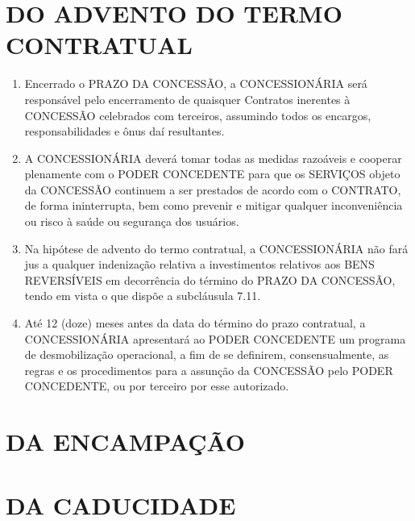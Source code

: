 \documentclass[a4paper,11pt]{report} %
\begin{document}
\section{DO ADVENTO DO TERMO CONTRATUAL}
\label{sec:DEZU}
\begin{enumerate}
\item \label{itm:UFFU} Encerrado o PRAZO DA CONCESSÃO, a CONCESSIONÁRIA será responsável pelo encerramento de quaisquer Contratos inerentes à CONCESSÃO celebrados com terceiros, assumindo todos os encargos, responsabilidades e ônus daí resultantes.

\item \label{itm:8PMK} A CONCESSIONÁRIA deverá tomar todas as medidas razoáveis e cooperar plenamente com o PODER CONCEDENTE para que os SERVIÇOS objeto da CONCESSÃO continuem a ser prestados de acordo com o CONTRATO, de forma ininterrupta, bem como prevenir e mitigar qualquer inconveniência ou risco à saúde ou segurança dos usuários.

\item \label{itm:JD97} Na hipótese de advento do termo contratual, a CONCESSIONÁRIA não fará jus a qualquer indenização relativa a investimentos relativos aos BENS REVERSÍVEIS em decorrência do término do PRAZO DA CONCESSÃO, tendo em vista o que dispõe a subcláusula 7.11.

\item \label{itm:8978} Até 12 (doze) meses antes da data do término do prazo contratual, a CONCESSIONÁRIA apresentará ao PODER CONCEDENTE um programa de desmobilização operacional, a fim de se definirem, consensualmente, as regras e os procedimentos para a assunção da CONCESSÃO pelo PODER CONCEDENTE, ou por terceiro por esse autorizado.
\end{enumerate}

\section{DA ENCAMPAÇÃO}
\label{sec:545J}
\begin{enumerate}

\end{enumerate}

\section{DA CADUCIDADE}
\label{sec:GEEC}
\begin{enumerate}
\end{enumerate}
\end{document}
